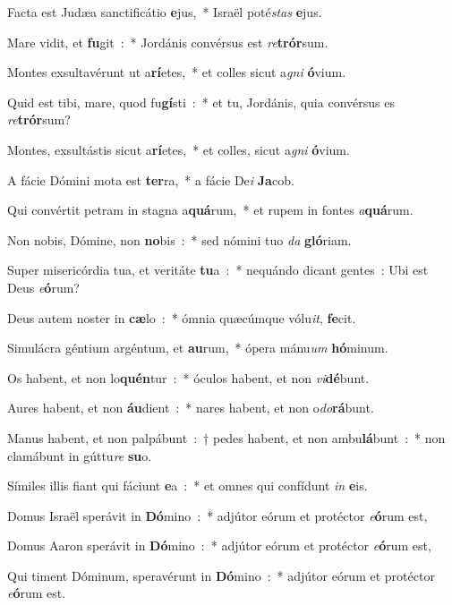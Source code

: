 ﻿\item Facta est Judæa sanctificátio \textbf{e}\-jus,~* Israël poté\emph{stas} \textbf{e}\-jus.
\item Mare vidit, et \textbf{fu}\-git~:~* Jordánis convérsus est \emph{re}\-\textbf{trór}\-sum.
\item Montes exsultavérunt ut a\textbf{rí}\-etes,~* et colles sicut a\-\emph{gni} \textbf{ó}\-vi\-um.
\item Quid est tibi, mare, quod fu\textbf{gí}\-sti~:~* et tu, Jordánis, quia convérsus es \emph{re}\-\textbf{trór}\-sum?
\item Montes, exsultástis sicut a\textbf{rí}\-etes,~* et colles, sicut a\emph{gni} \textbf{ó}\-vi\-um.
\item A fácie Dómini mota est \textbf{ter}\-ra,~* a fácie De\emph{i} \textbf{Ja}\-cob.
\item Qui convértit petram in stagna a\textbf{quá}\-rum,~* et rupem in fontes \emph{a}\-\textbf{quá}\-rum.
\item Non nobis, Dómine, non \textbf{no}\-bis~:~* sed nómini tuo \emph{da} \textbf{gló}\-riam.
\item Super misericórdia tua, et veritáte \textbf{tu}\-a~:~* nequándo dicant gentes~: Ubi est Deus \emph{e}\-\textbf{ó}\-rum?
\item Deus autem noster in \textbf{cæ}\-lo~:~* ómnia quæcúmque vólu\emph{it}, \textbf{fe}\-cit.
\item Simulácra géntium argéntum, et \textbf{au}\-rum,~* ópera mánu\emph{um} \textbf{hó}\-minum.
\item Os habent, et non lo\textbf{quén}\-tur~:~* óculos habent, et non \emph{vi}\-\textbf{dé}\-bunt.
\item Aures habent, et non \textbf{áu}\-dient~:~* nares habent, et non o\emph{do}\-\textbf{rá}\-bunt.
\item Manus habent, et non palpábunt~:~† pedes habent, et non ambu\textbf{lá}\-bunt~:~* non clamábunt in gúttu\emph{re} \textbf{su}\-o.
\item Símiles illis fiant qui fáciunt \textbf{e}\-a~:~* et omnes qui confídunt \emph{in} \textbf{e}\-is.
\item Domus Israël sperávit in \textbf{Dó}\-mino~:~* adjútor eórum et protéctor \emph{e}\-\textbf{ó}\-rum est,
\item Domus Aaron sperávit in \textbf{Dó}\-mino~:~* adjútor eórum et protéctor \emph{e}\-\textbf{ó}\-rum est,
\item Qui timent Dóminum, speravérunt in \textbf{Dó}\-mino~:~* adjútor eórum et protéctor \emph{e}\-\textbf{ó}\-rum est.
